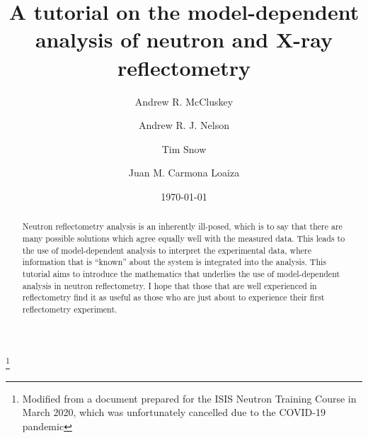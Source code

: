 \documentclass[
 reprint,
 superscriptaddress,
 amsmath,amssymb,
 aps,
]{revtex4-1}
\begin{document}
\title{A tutorial on the model-dependent analysis of neutron and X-ray reflectometry}%
\thanks{Modified from a document prepared for the ISIS Neutron Training Course in March 2020, which was unfortunately cancelled due to the COVID-19 pandemic}%

\author{Andrew R. McCluskey}
\author{Andrew R. J. Nelson}
\author{Tim Snow}
\author{Juan M. Carmona Loaiza}



\date{\today}%

\begin{abstract}
Neutron reflectometry analysis is an inherently ill-posed, which is to say that there are many possible solutions which agree equally well with the measured data. 
This leads to the use of model-dependent analysis to interpret the experimental data, where information that is ``known'' about the system is integrated into the analysis.
This tutorial aims to introduce the mathematics that underlies the use of model-dependent analysis in neutron reflectometry. 
I hope that those that are well experienced in reflectometry find it as useful as those who are just about to experience their first reflectometry experiment. 
\end{abstract}

\maketitle

\end{document}
